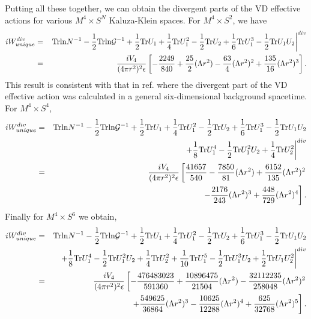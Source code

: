 \documentclass[a4paper,aps,preprint,groupedaddress,showpacs]{revtex4}
\begin{document}
Putting all these together, we can obtain the divergent parts
of the VD effective actions for various $M^{4}\times S^{N}$
Kaluza-Klein spaces. For $M^{4}\times S^{2}$, we have
\begin{eqnarray}
iW^{div}_{unique}&=&\left.
{\rm Trln}N^{-1}-\frac{1}{2}{\rm Trln}{\cal G}^{-1}+
\frac{1}{2}{\rm Tr}U_{1}+\frac{1}{4}{\rm Tr}U^{2}_{1}-
\frac{1}{2}{\rm Tr}U_{2}+\frac{1}{6}{\rm Tr}U^{3}_{1}-
\frac{1}{2}{\rm Tr}U_{1}U_{2}\right\vert^{div}
\nonumber\\
&=&
\frac{iV_{4}}{(4\pi r^{2})^{2}\epsilon}
\left[-\frac{2249}{840}+
\frac{25}{2}(\Lambda r^{2})-
\frac{63}{4}(\Lambda r^{2})^{2}+
\frac{135}{16}(\Lambda r^{2})^{3}
\right].
\label{w2}
\end{eqnarray}
This result is consistent with that in ref.\cite{CK1} where the 
divergent part of the VD effective action was calculated in a 
general six-dimensional background spacetime. 
For $M^{4}\times S^{4}$,
\begin{eqnarray}
iW^{div}_{unique}&=&
{\rm Trln}N^{-1}-\frac{1}{2}{\rm Trln}{\cal G}^{-1}+
\frac{1}{2}{\rm Tr}U_{1}+\frac{1}{4}{\rm Tr}U^{2}_{1}-
\frac{1}{2}{\rm Tr}U_{2}+\frac{1}{6}{\rm Tr}U^{3}_{1}-
\frac{1}{2}{\rm Tr}U_{1}U_{2}
\nonumber\\
&&\ \ \left.+\frac{1}{8}{\rm Tr}U^{4}_{1}-
\frac{1}{2}{\rm Tr}U^{2}_{1}U_{2}+
\frac{1}{4}{\rm Tr}U^{2}_{2}\right\vert^{div}
\nonumber\\
&=&
\frac{iV_{4}}{(4\pi r^{2})^{2}\epsilon}
\left[\frac{41657}{540}-
\frac{7850}{81}(\Lambda r^{2})+
\frac{6152}{135}(\Lambda r^{2})^{2}\right.
\nonumber\\
&&\ \ \left.-
\frac{2176}{243}(\Lambda r^{2})^{3}+
\frac{448}{729}(\Lambda r^{2})^{4}
\right].
\label{w4}
\end{eqnarray}
Finally for $M^{4}\times S^{6}$ we obtain,
\begin{eqnarray}
iW^{div}_{unique}&=&
{\rm Trln}N^{-1}-\frac{1}{2}{\rm Trln}{\cal G}^{-1}+
\frac{1}{2}{\rm Tr}U_{1}+\frac{1}{4}{\rm Tr}U^{2}_{1}-
\frac{1}{2}{\rm Tr}U_{2}+\frac{1}{6}{\rm Tr}U^{3}_{1}-
\frac{1}{2}{\rm Tr}U_{1}U_{2}
\nonumber\\
&&\ \ \left.+\frac{1}{8}{\rm Tr}U^{4}_{1}
-\frac{1}{2}{\rm Tr}U^{2}_{1}U_{2}+
\frac{1}{4}{\rm Tr}U^{2}_{2}+
\frac{1}{10}{\rm Tr}U^{5}_{1}-
\frac{1}{2}{\rm Tr}U^{3}_{1}U_{2}+
\frac{1}{2}{\rm Tr}U_{1}U^{2}_{2}\right\vert^{div}
\nonumber\\
&=&\frac{iV_{4}}{(4\pi r^{2})^{2}\epsilon}
\left[-\frac{476483023}{591360}+
\frac{10896475}{21504}(\Lambda r^{2})-
\frac{32112235}{258048}(\Lambda r^{2})^{2}\right.
\nonumber\\
&&\ \ \ \ \ \left.
+\frac{549625}{36864}(\Lambda r^{2})^{3}-
\frac{10625}{12288}(\Lambda r^{2})^{4}+
\frac{625}{32768}(\Lambda r^{2})^{5}\right].
\label{w6}
\end{eqnarray}
\end{document}
